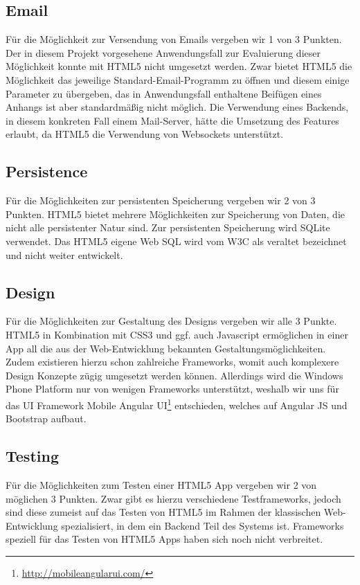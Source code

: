 \subsection{Email}
Für die Möglichkeit zur Versendung von Emails vergeben wir 1 von 3 Punkten. Der in diesem Projekt vorgesehene Anwendungsfall zur Evaluierung dieser Möglichkeit konnte mit HTML5 nicht umgesetzt werden. Zwar bietet HTML5 die Möglichkeit das jeweilige Standard-Email-Programm zu öffnen und diesem einige Parameter zu übergeben, das in Anwendungsfall enthaltene Beifügen eines Anhangs ist aber standardmäßig nicht möglich. Die Verwendung eines Backends, in diesem konkreten Fall einem Mail-Server, hätte die Umsetzung des Features erlaubt, da HTML5 die Verwendung von Websockets unterstützt.

\subsection{Persistence}
Für die Möglichkeiten zur persistenten Speicherung vergeben wir 2 von 3 Punkten. HTML5 bietet mehrere Möglichkeiten zur Speicherung von Daten, die nicht alle persistenter Natur sind. Zur persistenten Speicherung wird SQLite verwendet. Das HTML5 eigene Web SQL wird vom W3C als veraltet bezeichnet und nicht weiter entwickelt.

\subsection{Design}
Für die Möglichkeiten zur Gestaltung des Designs vergeben wir alle 3 Punkte. HTML5 in Kombination mit CSS3 und ggf. auch Javascript ermöglichen in einer App all die aus der Web-Entwicklung bekannten Gestaltungsmöglichkeiten. Zudem existieren hierzu schon zahlreiche Frameworks, womit auch komplexere Design Konzepte zügig umgesetzt werden können. Allerdings wird die Windows Phone Platform nur von wenigen Frameworks unterstützt, weshalb wir uns für das UI Framework Mobile Angular UI\footnote{\url{http://mobileangularui.com/}} entschieden, welches auf Angular JS und Bootstrap aufbaut.

\subsection{Testing}
Für die Möglichkeiten zum Testen einer HTML5 App vergeben wir 2 von möglichen 3 Punkten. Zwar gibt es hierzu verschiedene Testframeworks, jedoch sind diese zumeist auf das Testen von HTML5 im Rahmen der klassischen Web-Entwicklung spezialisiert, in dem ein Backend Teil des Systems ist. Frameworks speziell für das Testen von HTML5 Apps haben sich noch nicht verbreitet.

